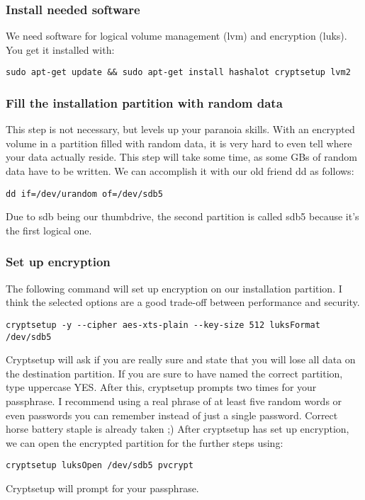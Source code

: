 \documentclass[12pt,a4paper]{article}
\begin{document}
\subsubsection{Install needed software}
We need software for logical volume management (lvm) and encryption (luks). You get it installed with:
\begin{Verbatim}[commandchars=\\\{\}]
sudo apt-get update && sudo apt-get install hashalot cryptsetup lvm2
\end{Verbatim}

\subsubsection{Fill the installation partition with random data}
This step is not necessary, but levels up your paranoia skills. With an encrypted volume in a partition filled with random data, it is very hard to even tell where your data actually reside. This step will take some time, as some GBs of random data have to be written. We can accomplish it with our old friend dd as follows:
\begin{Verbatim}[commandchars=\\\{\}]
dd if=/dev/urandom of=/dev/sdb5
\end{Verbatim}
Due to sdb being our thumbdrive, the second partition is called sdb5 because it's the first logical one.

\subsubsection{Set up encryption}
The following command will set up encryption on our installation partition. I think the selected options are a good trade-off between performance and security.
\begin{Verbatim}[commandchars=\\\{\}]
cryptsetup -y --cipher aes-xts-plain --key-size 512 luksFormat /dev/sdb5
\end{Verbatim}
Cryptsetup will ask if you are really sure and state that you will lose all data on the destination partition. If you are sure to have named the correct partition, type uppercase YES. After this, cryptsetup prompts two times for your passphrase. I recommend using a real phrase of at least five random words or even passwords you can remember instead of just a single password. Correct horse battery staple is already taken ;) After cryptsetup has set up encryption, we can open the encrypted partition for the further steps using:
\begin{Verbatim}[commandchars=\\\{\}]
cryptsetup luksOpen /dev/sdb5 pvcrypt
\end{Verbatim}
Cryptsetup will prompt for your passphrase.
\end{document}
